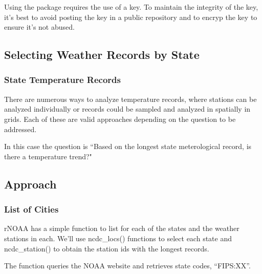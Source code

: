 \documentclass{article}
\begin{document}
Using the package requires the use of a key. To maintain the integrity of the key, it's best to avoid posting the key in a public repository and to encryp the key to ensure it's not abused. 

\subsection{Selecting Weather Records by State}

\subsubsection{State Temperature Records}

There are numerous ways to analyze temperature records, where stations can be analyzed individually or records could be sampled and analyzed in spatially in grids. Each of these are valid approaches depending on the question to be addressed. 

In this case the question is ``Based on the longest state meterological record, is there a temperature trend?"

\subsection{Approach}

\subsubsection{List of Cities}

rNOAA has a simple function to list for each of the states and the weather stations in each. We'll use ncdc\_locs() functions to select each state and ncdc\_station() to obtain the station ids with the longest records. 

\begin{knitrout}
\color{fgcolor}\begin{kframe}
\begin{alltt}
\hlstd{(}\hlstd{=}\hlstd{,} \hlstd{=}\hlstd{)}

\end{alltt}
\end{kframe}
\end{knitrout}

The function queries the NOAA website and retrieves state codes, ``FIPS:XX''.  
\end{document}

